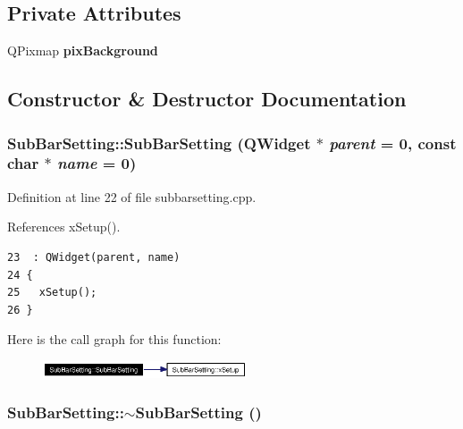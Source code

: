 \subsection*{Private Attributes}
\begin{CompactItemize}
\item 
QPixmap {\bf pix\-Background}
\end{CompactItemize}


\subsection{Constructor \& Destructor Documentation}
\subsubsection{\setlength{\rightskip}{0pt plus 5cm}Sub\-Bar\-Setting::Sub\-Bar\-Setting ({\bf QWidget} $\ast$ {\em parent} = 0, const char $\ast$ {\em name} = 0)}\label{classSubBarSetting_SubBarSettinga0}




Definition at line 22 of file subbarsetting.cpp.

References x\-Setup().



\footnotesize\begin{verbatim}23  : QWidget(parent, name)
24 {
25   xSetup();
26 }
\end{verbatim}\normalsize 


Here is the call graph for this function:\begin{figure}[H]
\begin{center}
\leavevmode
\includegraphics[width=171pt]{classSubBarSetting_SubBarSettinga0_cgraph}
\end{center}
\end{figure}
\subsubsection{\setlength{\rightskip}{0pt plus 5cm}Sub\-Bar\-Setting::$\sim${\bf Sub\-Bar\-Setting} ()}\label{classSubBarSetting_SubBarSettinga1}




